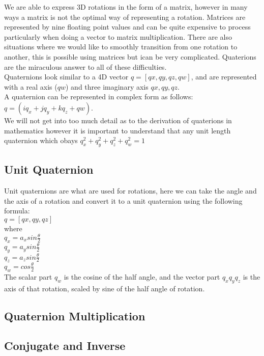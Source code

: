 \begin{flushleft}
We are able to express 3D rotations in the form of a matrix, however in many ways a matrix is not the optimal way of representing a rotation. Matrices are represented by nine floating point values and can be quite expensive to process particularly when doing a vector to matrix multiplication. There are also situations where we would like to smoothly transition from one rotation to another, this is possible using matrices but ican be very complicated. Quaterions are the miraculous answer to all of these difficulties.\\
Quaternions look similar to a 4D vector $ q = [qx, qy, qz, qw]$, and are represented with a real axis ($qw$) and three imaginary axis $qx, qy, qz$.\\
A quaternion can be represented in complex form as follows: $q = (iq_x + jq_y + kq_z + qw)$. \\ 
We will not get into too much detail as to the derivation of quaterions in mathematics however it is important to understand that any unit length quaternion which obays $q_x^2 + q_y^2 + q_z^2 + q_w^2 = 1$ \\ 

\end{flushleft}

\subsection{Unit Quaternion}
Unit quaternions are what are used for rotations, here we can take the angle and the axis of a rotation and convert it to a unit quaternion using the following formula: \\
$q = [qx, qy, qz]$\\
where\\
$q_x = a_x sin \frac{\theta}{2}$\\
$q_y = a_y sin \frac{\theta}{2}$\\
$q_z = a_z sin \frac{\theta}{2}$\\
$q_w = cos \frac{\theta}{2}$\\
The scalar part $q_w$ is the cosine of the half angle, and the vector part $q_x q_y q_z$ is the axis of that rotation, scaled by sine of the half angle of rotation.  

\subsection{Quaternion Multiplication}

\subsection{Conjugate and Inverse}



